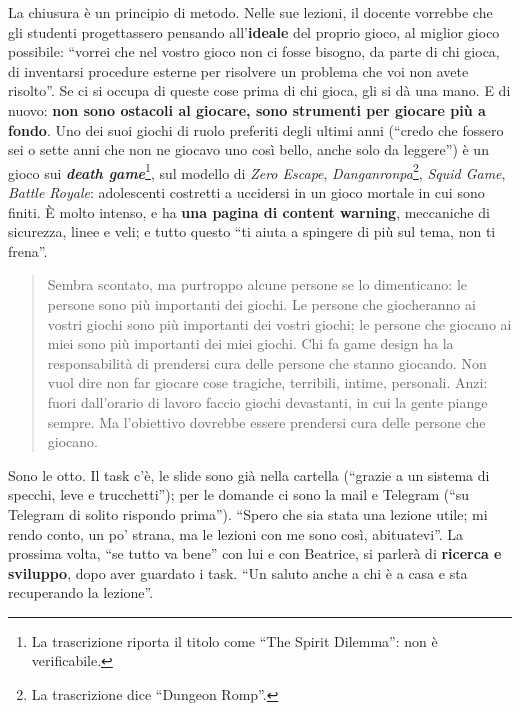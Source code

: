 La chiusura è un principio di metodo. Nelle sue lezioni, il docente vorrebbe che gli
studenti progettassero pensando all'\textbf{ideale} del proprio gioco, al miglior gioco
possibile: ``vorrei che nel vostro gioco non ci fosse bisogno, da parte di chi gioca,
di inventarsi procedure esterne per risolvere un problema che voi non avete risolto''.
Se ci si occupa di queste cose prima di chi gioca, gli si dà una mano. E di nuovo:
\textbf{non sono ostacoli al giocare, sono strumenti per giocare più a fondo}. Uno dei
suoi giochi di ruolo preferiti degli ultimi anni (``credo che fossero sei o sette anni
che non ne giocavo uno così bello, anche solo da leggere'') è un gioco sui
\textbf{\emph{death game}}\footnote{La trascrizione riporta il titolo come ``The Spirit
Dilemma'': non è verificabile.}, sul modello di \emph{Zero Escape},
\emph{Danganronpa}\footnote{La trascrizione dice ``Dungeon Romp''.}, \emph{Squid Game},
\emph{Battle Royale}: adolescenti costretti a uccidersi in un gioco mortale in cui sono
finiti. È molto intenso, e ha \textbf{una pagina di content warning}, meccaniche di
sicurezza, linee e veli; e tutto questo ``ti aiuta a spingere di più sul tema, non ti
frena''.

\begin{quote}
Sembra scontato, ma purtroppo alcune persone se lo dimenticano: le persone sono più
importanti dei giochi. Le persone che giocheranno ai vostri giochi sono più importanti
dei vostri giochi; le persone che giocano ai miei sono più importanti dei miei giochi.
Chi fa game design ha la responsabilità di prendersi cura delle persone che stanno
giocando. Non vuol dire non far giocare cose tragiche, terribili, intime, personali.
Anzi: fuori dall'orario di lavoro faccio giochi devastanti, in cui la gente piange
sempre. Ma l'obiettivo dovrebbe essere prendersi cura delle persone che giocano.
\end{quote}

Sono le otto. Il task c'è, le slide sono già nella cartella (``grazie a un sistema di
specchi, leve e trucchetti''); per le domande ci sono la mail e Telegram (``su Telegram
di solito rispondo prima''). ``Spero che sia stata una lezione utile; mi rendo conto, un
po' strana, ma le lezioni con me sono così, abituatevi''. La prossima volta, ``se tutto
va bene'' con lui e con Beatrice, si parlerà di \textbf{ricerca e sviluppo}, dopo aver
guardato i task. ``Un saluto anche a chi è a casa e sta recuperando la lezione''.

